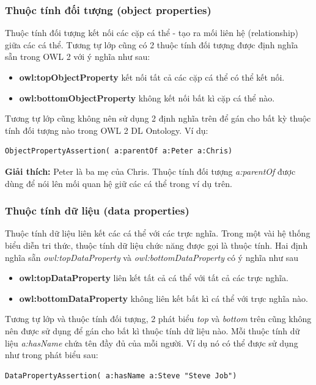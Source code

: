 \subsubsection{Thuộc tính đối tượng (object properties)} 
Thuộc tính đối tượng kết nối các cặp cá thể - tạo ra mối liên hệ (relationship) giữa các cá thể. Tương tự lớp cũng có 2 thuộc tính đối tượng được định nghĩa sẵn trong OWL 2 với ý nghĩa như sau:
\begin{itemize}
\item \textbf{owl:topObjectProperty} kết nối tất cả các cặp cá thể có thể kết nối.
\item \textbf{owl:bottomObjectProperty} không kết nối bất kì cặp cá thể nào. 
\end{itemize}
Tương tự lớp cũng không nên sử dụng 2 định nghĩa trên để gán cho bất kỳ thuộc tính đối tượng nào trong OWL 2 DL Ontology. Ví dụ:
\begin{verbatim}
ObjectPropertyAssertion( a:parentOf a:Peter a:Chris)  
\end{verbatim}
\textbf{Giải thích:} Peter là ba mẹ của Chris. Thuộc tính đối tượng \textit{a:parentOf} được dùng để nói lên mối quan hệ giữ các cá thể trong ví dụ trên.

\subsubsection{Thuộc tính dữ liệu (data properties)}
Thuộc tính dữ liệu liên kết các cá thể với các trực nghĩa. Trong một vài hệ thống biểu diễn tri thức, thuộc tính dữ liệu chức năng được gọi là thuộc tính.
Hai định nghĩa sẵn \textit{owl:topDataProperty} và \textit{owl:bottomDataProperty} có ý nghĩa như sau
\begin{itemize}
\item \textbf{owl:topDataProperty} liên kết tất cả cá thể với tất cả các trực nghĩa.
\item \textbf{owl:bottomDataProperty} không liên kết bất kì cá thể với trực nghĩa nào.
\end{itemize}
Tương tự lớp và thuộc tính đối tượng, 2 phát biểu \textit{top} và \textit{bottom} trên cũng không nên được sử dụng để gán cho bất kì thuộc tính dữ liệu nào. Mỗi thuộc tính dữ liệu \textit{a:hasName} chứa tên đầy đủ của mỗi người. Ví dụ nó có thể được sử dụng như trong phát biểu sau:

\begin{verbatim}
DataPropertyAssertion( a:hasName a:Steve "Steve Job") 
\end{verbatim}

